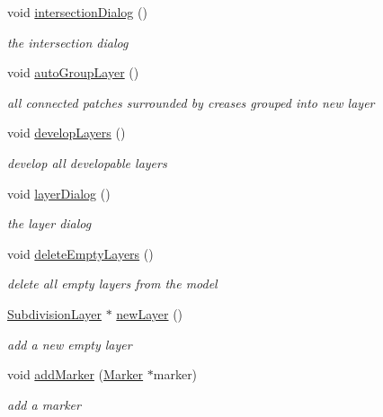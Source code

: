\begin{DoxyCompactItemize}
void \hyperlink{classShipCAD_1_1Controller_aa96a4f37de274284919284651b9bd22a}{intersection\-Dialog} ()
\begin{DoxyCompactList}\small\item\em the intersection dialog \end{DoxyCompactList}\item 
void \hyperlink{classShipCAD_1_1Controller_a72c34ce03882c0bb27603cb69af988a6}{auto\-Group\-Layer} ()
\begin{DoxyCompactList}\small\item\em all connected patches surrounded by creases grouped into new layer \end{DoxyCompactList}\item 
void \hyperlink{classShipCAD_1_1Controller_a3e7966e9726ba79f9978e691ce096964}{develop\-Layers} ()
\begin{DoxyCompactList}\small\item\em develop all developable layers \end{DoxyCompactList}\item 
void \hyperlink{classShipCAD_1_1Controller_a9d0f1f9811e86e401d145147361d5ac4}{layer\-Dialog} ()
\begin{DoxyCompactList}\small\item\em the layer dialog \end{DoxyCompactList}\item 
void \hyperlink{classShipCAD_1_1Controller_a2b966f1434e1df01e0bfd589cdb7425d}{delete\-Empty\-Layers} ()
\begin{DoxyCompactList}\small\item\em delete all empty layers from the model \end{DoxyCompactList}\item 
\hyperlink{classShipCAD_1_1SubdivisionLayer}{Subdivision\-Layer} $\ast$ \hyperlink{classShipCAD_1_1Controller_afe6e433ecde6d13e02f409e56b6d258b}{new\-Layer} ()
\begin{DoxyCompactList}\small\item\em add a new empty layer \end{DoxyCompactList}\item 
void \hyperlink{classShipCAD_1_1Controller_aca1410f5433767680bfe16426b32cbc0}{add\-Marker} (\hyperlink{classShipCAD_1_1Marker}{Marker} $\ast$marker)
\begin{DoxyCompactList}\small\item\em add a marker \end{DoxyCompactList}\item 

\end{DoxyCompactItemize}
